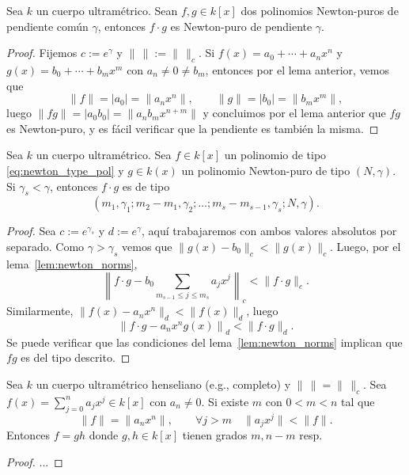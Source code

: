 \documentclass[teoria-numeros.tex]{subfiles}
\begin{document}
\begin{lem}
	Sea $k$ un cuerpo ultramétrico.
	Sean $f, g \in k[x]$ dos polinomios Newton-puros de pendiente común $\gamma$, entonces $f\cdot g$ es Newton-puro de pendiente $\gamma$.
\end{lem}
\begin{proof}
	Fijemos $c := e^\gamma$ y $\|\,\| := \|\,\|_c$.
	Si $f(x) = a_0 + \cdots + a_nx^n$ y $g(x) = b_0 + \cdots + b_mx^m$ con $a_n \ne 0 \ne b_m$, entonces por el lema anterior, vemos que
	$$ \|f\| = |a_0| = \|a_nx^n\|, \qquad \|g\| = |b_0| = \|b_mx^m\|, $$
	luego $\|fg\| = |a_0b_0| = \|a_nb_m x^{n+m}\|$ y concluimos por el lema anterior que $fg$ es Newton-puro, y es fácil verificar que la pendiente
	es también la misma.
\end{proof}

\begin{lem}\label{lem:adding_newton_types}
	Sea $k$ un cuerpo ultramétrico.
	Sea $f \in k[x]$ un polinomio de tipo \eqref{eq:newton_type_pol} y $g \in k(x)$ un polinomio Newton-puro de tipo $(N, \gamma)$.
	Si $\gamma_s < \gamma$, entonces $f\cdot g$ es de tipo
	$$ (m_1, \gamma_1; m_2 - m_1, \gamma_2; \dots; m_s - m_{s-1}, \gamma_s; N, \gamma). $$
\end{lem}
\begin{proof}
	Sea $c := e^{\gamma_s}$ y $d := e^{\gamma}$, aquí trabajaremos con ambos valores absolutos por separado.
	Como $\gamma > \gamma_s$ vemos que $\|g(x) - b_0\|_c < \|g(x)\|_c$. Luego, por el lema~\ref{lem:newton_norms},
	$$ \left\| f\cdot g - b_0 \sum_{m_{s-1} \le j \le m_s} a_jx^j \right\|_c < \|f\cdot g\|_c. $$
	Similarmente, $\|f(x) - a_nx^n\|_d < \|f(x)\|_d$, luego
	$$ \left\| f\cdot g - a_nx^n g(x) \right\|_d < \|f\cdot g\|_d. $$
	Se puede verificar que las condiciones del lema~\ref{lem:newton_norms} implican que $fg$ es del tipo descrito.
\end{proof}

\begin{lem}
	Sea $k$ un cuerpo ultramétrico henseliano (e.g., completo) y $\|\,\| = \|\,\|_c$.
	Sea $f(x) = \sum_{j=0}^{n} a_jx^j \in k[x]$ con $a_n \ne 0$.
	Si existe $m$ con $0 < m < n$ tal que
	$$ \|f\| = \|a_nx^n\|, \qquad \forall j > m\quad \|a_jx^j\| < \|f\|. $$
	Entonces $f = gh$ donde $g, h \in k[x]$ tienen grados $m, n-m$ resp.
\end{lem}
\begin{proof}
	...
\end{proof}
\end{document}
